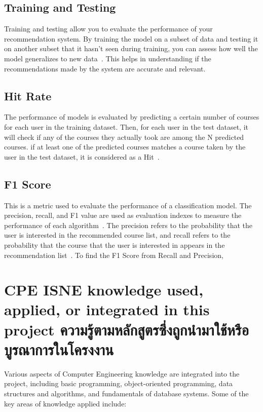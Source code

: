 \subsection{Training and Testing}

Training and testing allow you to evaluate the performance of your recommendation system. 
By training the model on a subset of data and testing it on another subset that it hasn't 
seen during training, you can assess how well the model generalizes to new data~\cite{AvinashRSonule2020UnswNb15DA}. This helps 
in understanding if the recommendations made by the system are accurate and relevant.

\subsection{Hit Rate}

The performance of models is evaluated by predicting a certain number of courses for each user in the 
training dataset. Then, for each user in the test dataset, it will check if any of the courses they 
actually took are among the N predicted courses. if at least one of the predicted courses matches a 
course taken by the user in the test dataset, it is considered as a Hit~\cite{Panigrahy2017}.

\subsection{F1 Score}

This is a metric used to evaluate the performance of a classification model. The precision, recall, 
and F1 value are used as evaluation indexes to measure the performance of each 
algorithm~\cite{yacouby-axman-2020-probabilistic}. The precision refers to the probability that the 
user is interested in the recommended course list, and recall refers to the probability that the 
course that the user is interested in appears in the recommendation list~\cite{Xu2019}. 
To find the F1 Score from Recall and Precision, 

\section{\ifenglish%
\ifcpe CPE \else ISNE \fi knowledge used, applied, or integrated in this project
\else%
ความรู้ตามหลักสูตรซึ่งถูกนำมาใช้หรือบูรณาการในโครงงาน
\fi
}

Various aspects of Computer Engineering knowledge are integrated into the project, including basic programming, object-oriented programming, data structures and algorithms, and fundamentals of database systems.
Some of the key areas of knowledge applied include:

